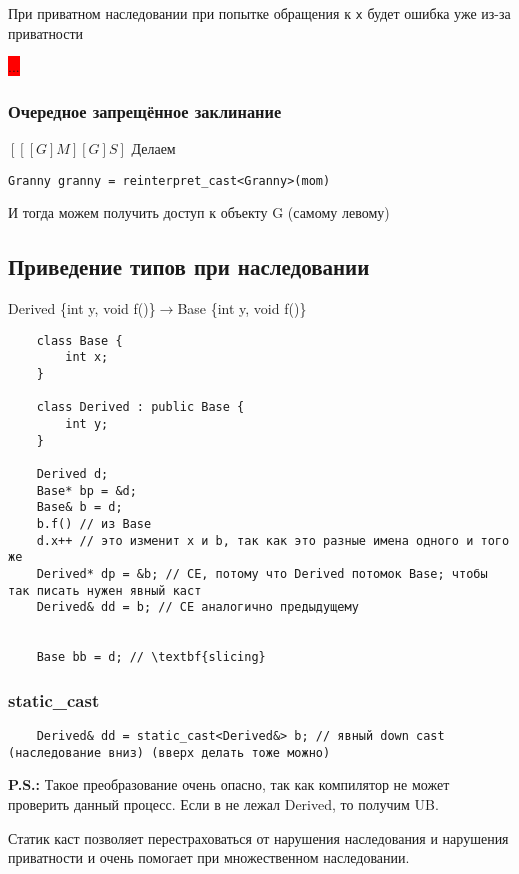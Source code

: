 \documentclass[12pt]{article}
\newcommand{\ps}{\textbf{P.S.: }}
\begin{document}
При приватном наследовании при попытке обращения к \texttt{x} будет ошибка уже из-за приватности

\colorbox{red}{...}

\subsubsection{Очередное запрещённое заклинание}
$[[[G]M][G]S]$
Делаем 
\begin{lstlisting}
Granny granny = reinterpret_cast<Granny>(mom)
\end{lstlisting}
И тогда можем получить доступ к объекту G (самому левому)

\subsection{Приведение типов при наследовании}

\begin{center}
	Derived \{int y, void f()\}$\rightarrow$Base \{int y, void f()\}
\end{center}

\begin{lstlisting}
	class Base {
		int x;
	}
	
	class Derived : public Base {
		int y;
	}

	Derived d;
	Base* bp = &d;
	Base& b = d;
	b.f() // из Base
	d.x++ // это изменит x и b, так как это разные имена одного и того же 
	Derived* dp = &b; // CE, потому что Derived потомок Base; чтобы так писать нужен явный каст
	Derived& dd = b; // CE аналогично предыдущему
	
	
	Base bb = d; // \textbf{slicing}
\end{lstlisting}

\subsubsection{static\_cast}

\begin{lstlisting}
	Derived& dd = static_cast<Derived&> b; // явный down cast (наследование вниз) (вверх делать тоже можно)
\end{lstlisting}

\ps Такое преобразование очень опасно, так как компилятор не может проверить данный процесс. Если в не лежал Derived, то получим UB. 


Статик каст позволяет перестраховаться от нарушения наследования и нарушения приватности и очень помогает при множественном наследовании. 
\end{document}
